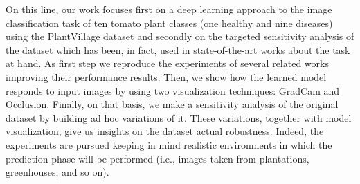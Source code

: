 \par On this line, our work focuses first on a deep learning approach to the image classification task of ten tomato plant classes (one healthy and nine diseases) using the PlantVillage dataset\cite{plantvillage} and secondly on the targeted sensitivity analysis of the dataset which has been, in fact, used in state-of-the-art works about the task at hand. As first step we reproduce the experiments of several related works improving their performance results. Then, we show how the learned model responds to input images by using two visualization techniques: GradCam and Occlusion. Finally, on that basis, we make a sensitivity analysis of the original dataset by building ad hoc variations of it. These variations, together with model visualization, give us insights on the dataset actual robustness. Indeed, the experiments are pursued keeping in mind realistic environments in which the prediction phase will be performed (i.e., images taken from plantations, greenhouses, and so on).